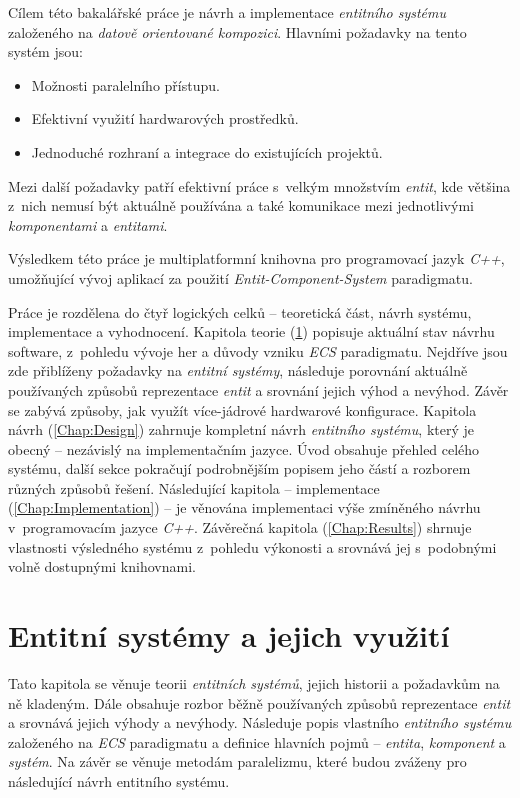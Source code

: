 Cílem této bakalářské práce je návrh a implementace \emph{entitního systému} založeného na \emph{datově orientované kompozici}. Hlavními požadavky na tento systém jsou: 
\begin{itemize}
	\item Možnosti paralelního přístupu.
	\item Efektivní využití hardwarových prostředků.
	\item Jednoduché rozhraní a integrace do existujících projektů.
\end{itemize}
Mezi další požadavky patří efektivní práce s~velkým množstvím \emph{entit}, kde většina z~nich nemusí být aktuálně používána a také komunikace mezi jednotlivými \emph{komponentami} a \emph{entitami}.

Výsledkem této práce je multiplatformní knihovna pro programovací jazyk \emph{C++}, umožňující vývoj aplikací za použití \emph{Entit-Component-System} paradigmatu. 

Práce je rozdělena do čtyř logických celků -- teoretická část, návrh systému, implementace a vyhodnocení. Kapitola teorie (\ref{Chap:Theory}) popisuje aktuální stav návrhu software, z~pohledu vývoje her a důvody vzniku \emph{ECS} paradigmatu. Nejdříve jsou zde přiblíženy požadavky na \emph{entitní systémy}, následuje porovnání aktuálně používaných způsobů reprezentace \emph{entit} a srovnání jejich výhod a nevýhod. Závěr se zabývá způsoby, jak využít více-jádrové hardwarové konfigurace. Kapitola návrh (\ref{Chap:Design}) zahrnuje kompletní návrh \emph{entitního systému}, který je obecný -- nezávislý na implementačním jazyce. Úvod obsahuje přehled celého systému, další sekce pokračují podrobnějším popisem jeho částí a rozborem různých způsobů řešení. Následující kapitola -- implementace (\ref{Chap:Implementation}) -- je věnována implementaci výše zmíněného návrhu v~programovacím jazyce \emph{C++}. Závěrečná kapitola (\ref{Chap:Results}) shrnuje vlastnosti výsledného systému z~pohledu výkonosti a srovnává jej s~podobnými volně dostupnými knihovnami.

\chapter{Entitní systémy a jejich využití}
\label{Chap:Theory}

Tato kapitola se věnuje teorii \emph{entitních systémů}, jejich historii a požadavkům na ně kladeným. Dále obsahuje rozbor běžně používaných způsobů reprezentace \emph{entit} a srovnává jejich výhody a nevýhody. Následuje popis vlastního \emph{entitního systému} založeného na \emph{ECS} paradigmatu a definice hlavních pojmů -- \emph{entita}, \emph{komponent} a \emph{systém}. Na závěr se věnuje metodám paralelizmu, které budou zváženy pro následující návrh entitního systému.

